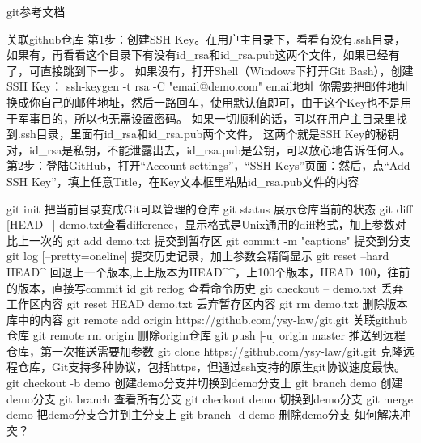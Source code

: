 git参考文档

关联github仓库
第1步：创建SSH Key。在用户主目录下，看看有没有.ssh目录，
       如果有，再看看这个目录下有没有id_rsa和id_rsa.pub这两个文件，如果已经有了，可直接跳到下一步。
       如果没有，打开Shell（Windows下打开Git Bash），创建SSH Key：
       ssh-keygen -t rsa -C "email@demo.com" email地址	 
       你需要把邮件地址换成你自己的邮件地址，然后一路回车，使用默认值即可，由于这个Key也不是用于军事目的，所以也无需设置密码。
       如果一切顺利的话，可以在用户主目录里找到.ssh目录，里面有id_rsa和id_rsa.pub两个文件，
	   这两个就是SSH Key的秘钥对，id_rsa是私钥，不能泄露出去，id_rsa.pub是公钥，可以放心地告诉任何人。	
第2步：登陆GitHub，打开“Account settings”，“SSH Keys”页面：然后，点“Add SSH Key”，填上任意Title，在Key文本框里粘贴id_rsa.pub文件的内容	   

git init                   把当前目录变成Git可以管理的仓库
git status                 展示仓库当前的状态
git diff [HEAD --] demo.txt查看difference，显示格式是Unix通用的diff格式，加上参数对比上一次的
git add  demo.txt          提交到暂存区
git commit -m "captions"   提交到分支
git log [--pretty=oneline] 提交历史记录，加上参数会精简显示
git reset --hard HEAD^     回退上一个版本,上上版本为HEAD^^，上100个版本，HEAD~100，往前的版本，直接写commit id
git reflog                 查看命令历史
git checkout -- demo.txt   丢弃工作区内容
git reset HEAD demo.txt    丢弃暂存区内容 
git rm demo.txt            删除版本库中的内容
git remote add origin https://github.com/ysy-law/git.git  关联github仓库
git remote rm origin                                      删除origin仓库
git push [-u] origin master                               推送到远程仓库，第一次推送需要加参数
git clone https://github.com/ysy-law/git.git              克隆远程仓库，Git支持多种协议，包括https，但通过ssh支持的原生git协议速度最快。
git checkout -b demo       创建demo分支并切换到demo分支上
git branch demo            创建demo分支
git branch                 查看所有分支
git checkout demo          切换到demo分支
git merge demo             把demo分支合并到主分支上
git branch -d demo         删除demo分支
如何解决冲突？